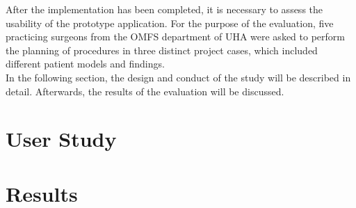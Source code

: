 After the implementation has been completed, it is necessary to assess 
the usability of the prototype application.
For the purpose of the evaluation, five practicing surgeons from the
OMFS department of UHA were asked to perform the planning of procedures 
in three distinct project cases, which included different patient models 
and findings.
\\ In the following section, the design and conduct of the study will be 
described in detail.
Afterwards, the results of the evaluation will be discussed. 

\section{\label{sec::Methology}User Study}

\section{\label{sec::Results}Results}
